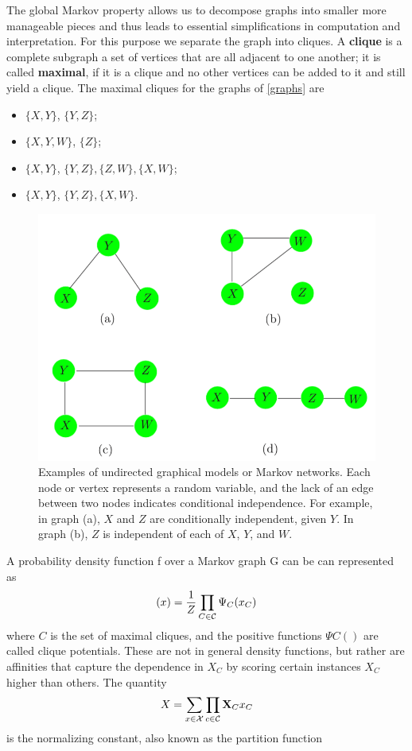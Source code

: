 \documentclass[12pt, letterpaper]{article}
\theoremstyle{definition}
\newcommand{\X}{\mathrm{\mathbf{X}}}
\begin{document}
The global Markov property allows us to decompose graphs into smaller more manageable pieces and thus leads to essential simplifications in computation and interpretation. For this purpose we separate the graph into cliques. A \textbf{clique} is a complete subgraph a set of vertices that are all adjacent to one another; it is called \textbf{maximal}, if it is a clique and no other vertices can be added to it and still yield a clique. The maximal cliques for the graphs of \autoref{graphs} are
\begin{itemize}
\item $\{X, Y\}$, $\{Y, Z\}$;
\item $\{X, Y, W\}$, $\{Z\}$;
\item $\{X, Y\}$, $\{Y, Z\}, \{Z, W\},\{X, W\}$;
\item $\{X, Y\}$, $\{Y, Z\}, \{X, W\}$.
\end{itemize}

\begin{figure}
\centering
\includegraphics[scale=0.45]{img/graphs}
\caption{Examples of undirected graphical models or Markov networks. Each node or vertex represents a random variable, and the lack of an edge between two nodes indicates conditional independence. For example, in graph (a), $X$ and $Z$ are conditionally independent, given $Y$. In graph (b), $Z$ is independent of each of $X$, $Y$, and $W$.}
\label{graphs}
\end{figure}
A probability density function f over a Markov graph G can be can represented as
\begin{equation}
(x) = \frac{1}{Z} \prod_{C \in \CMcal{C}} \Psi_C (x_C)
\end{equation}
where $C$ is the set of maximal cliques, and the positive functions $\Psi C()$ are called clique potentials.  These are not in general density functions, but rather are affinities that capture the dependence in $X_C$ by scoring certain instances $X_C$ higher than others. The quantity
\begin{equation}
X = \sum_{x \in \CMcal{X}} \prod_{c \in \CMcal{C}} \X_C{x_C}
\end{equation}
is the normalizing constant, also known as the partition function
\end{document}
